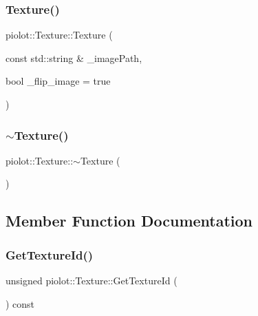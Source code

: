\subsubsection{\texorpdfstring{Texture()}{Texture()}}
{\footnotesize\ttfamily piolot\+::\+Texture\+::\+Texture (\begin{DoxyParamCaption}\item[{const std\+::string \&}]{\+\_\+image\+Path,  }\item[{bool}]{\+\_\+flip\+\_\+image = {\ttfamily true} }\end{DoxyParamCaption})\hspace{0.3cm}{\ttfamily [explicit]}}

\mbox{\label{classpiolot_1_1_texture_a6fb42c8e2f50a422647c01626b7c6a3a}} 
\subsubsection{\texorpdfstring{$\sim$\+Texture()}{~Texture()}}
{\footnotesize\ttfamily piolot\+::\+Texture\+::$\sim$\+Texture (\begin{DoxyParamCaption}{ }\end{DoxyParamCaption})\hspace{0.3cm}{\ttfamily [default]}}



\subsection{Member Function Documentation}
\mbox{\label{classpiolot_1_1_texture_ac169de31ffc45bb37a2702b82ec076b6}} 
\subsubsection{\texorpdfstring{Get\+Texture\+Id()}{GetTextureId()}}
{\footnotesize\ttfamily unsigned piolot\+::\+Texture\+::\+Get\+Texture\+Id (\begin{DoxyParamCaption}{ }\end{DoxyParamCaption}) const\hspace{0.3cm}{\ttfamily [inline]}}

